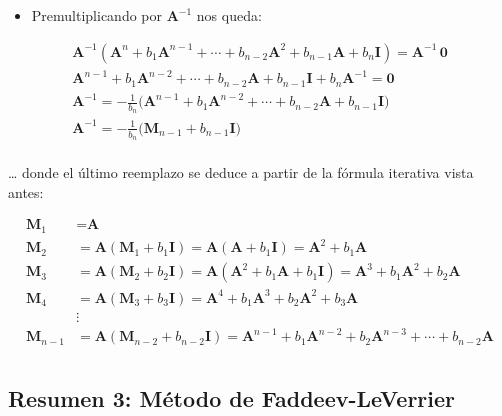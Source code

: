 \documentclass[openany]{book}
\providecommand{\tightlist}{%
  \setlength{\itemsep}{0pt}\setlength{\parskip}{0pt}}
\begin{document}
\begin{itemize}
\tightlist
\item
  Premultiplicando por \(\textbf{A}^{-1}\) nos queda:
\end{itemize}

\begin{gather*}
\textbf{A}^{-1} (\textbf{A}^n + b_1 \textbf{A}^{n-1} + \cdots + b_{n-2} \textbf{A}^2 + b_{n-1} \textbf{A} + b_n \textbf{I}) = \textbf{A}^{-1} \, \textbf{0} \\
\textbf{A}^{n-1} + b_1 \textbf{A}^{n-2} + \cdots + b_{n-2} \textbf{A} +b_{n-1} \textbf{I} + b_n \textbf{A}^{-1} = \textbf{0} \\
\textbf{A}^{-1} = - \frac{1}{b_n} \Big( \textbf{A}^{n-1} + b_1 \textbf{A}^{n-2} + \cdots + b_{n-2} \textbf{A} + b_{n-1} \textbf{I} \Big) \\
\textbf{A}^{-1} = - \frac{1}{b_n} \Big( \textbf{M}_{n-1} + b_{n-1} \textbf{I}  \Big) \\
\end{gather*}

\ldots{} donde el último reemplazo se deduce a partir de la fórmula iterativa vista antes:

\[
\begin{aligned}
\textbf{M}_1 &= \textbf{A}\\
\textbf{M}_2 &= \textbf{A} (\textbf{M}_{1} + b_{1} \textbf{I})  = \textbf{A} (\textbf{A} + b_{1} \textbf{I})= \textbf{A}^2 + b_{1} \textbf{A}\\
\textbf{M}_3 &= \textbf{A} (\textbf{M}_{2} + b_{2} \textbf{I})  = \textbf{A} (\textbf{A}^2 + b_{1} \textbf{A} + b_{1} \textbf{I})= \textbf{A}^3 + b_1 \textbf{A}^2 + b_{2} \textbf{A}\\
\textbf{M}_4 &= \textbf{A} (\textbf{M}_{3} + b_{3} \textbf{I}) = \textbf{A}^4 + b_1 \textbf{A}^3 + b_2 \textbf{A}^2 + b_{3} \textbf{A}\\
&\vdots \\
\textbf{M}_{n-1} &= \textbf{A} (\textbf{M}_{n-2} + b_{n-2} \textbf{I}) = \textbf{A}^{n-1} + b_1 \textbf{A}^{n-2} + b_2 \textbf{A}^{n-3} + \cdots + b_{n-2} \textbf{A}\\
\end{aligned}
\]

\hypertarget{resumen-3-muxe9todo-de-faddeev-leverrier}{%
\subsection{Resumen 3: Método de Faddeev-LeVerrier}\label{resumen-3-muxe9todo-de-faddeev-leverrier}}
\end{document}
